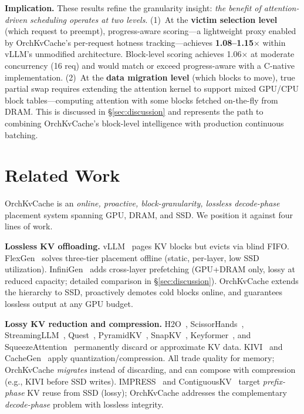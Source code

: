 \documentclass[conference]{IEEEtran}
\begin{document}
\textbf{Implication.} These results refine the granularity insight: \emph{the benefit of attention-driven scheduling operates at two levels}. (1)~At the \textbf{victim selection level} (which request to preempt), progress-aware scoring---a lightweight proxy enabled by OrchKvCache's per-request hotness tracking---achieves \textbf{1.08--1.15$\times$} within vLLM's unmodified architecture. Block-level scoring achieves 1.06$\times$ at moderate concurrency (16 req) and would match or exceed progress-aware with a C-native implementation. (2)~At the \textbf{data migration level} (which blocks to move), true partial swap requires extending the attention kernel to support mixed GPU/CPU block tables---computing attention with some blocks fetched on-the-fly from DRAM. This is discussed in \S\ref{sec:discussion} and represents the path to combining OrchKvCache's block-level intelligence with production continuous batching.



\section{Related Work}

OrchKvCache is an \emph{online, proactive, block-granularity, lossless decode-phase} placement system spanning GPU, DRAM, and SSD. We position it against four lines of work.

\textbf{Lossless KV offloading.}
vLLM~\cite{vllm} pages KV blocks but evicts via blind FIFO. FlexGen~\cite{flexgen} solves three-tier placement offline (static, per-layer, low SSD utilization). InfiniGen~\cite{infinigen} adds cross-layer prefetching (GPU+DRAM only, lossy at reduced capacity; detailed comparison in \S\ref{sec:discussion}). OrchKvCache extends the hierarchy to SSD, proactively demotes cold blocks online, and guarantees lossless output at any GPU budget.

\textbf{Lossy KV reduction and compression.}
H2O~\cite{h2o}, ScissorHands~\cite{scissorhands}, StreamingLLM~\cite{streamingllm}, Quest~\cite{quest}, PyramidKV~\cite{pyramidkv}, SnapKV~\cite{snapkv}, Keyformer~\cite{keyformer}, and SqueezeAttention~\cite{squeezeattention} permanently discard or approximate KV data. KIVI~\cite{kivi} and CacheGen~\cite{cachegen} apply quantization/compression. All trade quality for memory; OrchKvCache \emph{migrates} instead of discarding, and can compose with compression (e.g., KIVI before SSD writes). IMPRESS~\cite{impress} and ContiguousKV~\cite{contiguouskv} target \emph{prefix-phase} KV reuse from SSD (lossy); OrchKvCache addresses the complementary \emph{decode-phase} problem with lossless integrity.
\end{document}
